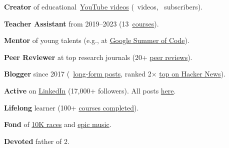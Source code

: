 \documentclass{files/CV/cesar}
\begin{document}
\textbf{Creator} of educational~\href{https://www.youtube.com/@cesarsotovalero}{YouTube videos} (\youtubevideos~videos, \ytSubscribers~subscribers).

\textbf{Teacher Assistant} from 2019--2023 (13~\href{https://www.cesarsotovalero.net/service#teaching}{courses}).

\textbf{Mentor} of young talents (e.g., at \href{https://summerofcode.withgoogle.com/archive/2021/projects/6679675211874304}{Google Summer of Code}).

\textbf{Peer Reviewer} at top research journals (20+ \href{https://www.cesarsotovalero.net/service#academic-reviewer}{peer reviews}).


\textbf{Blogger} since 2017 (\blogposts~\href{https://www.cesarsotovalero.net/blog}{long-form posts}, ranked 2$\times$ \href{https://news.ycombinator.com/favorites?id=cesarsotovalero}{top on Hacker News}).

\textbf{Active} on \href{https://linkedin.com/in/cesarsotovalero}{LinkedIn} (17,000+ followers). All posts \href{https://www.cesarsotovalero.net/linkedin}{here}.

\textbf{Lifelong} learner (100+ \href{https://www.cesarsotovalero.net/courses.html}{courses completed}).

\textbf{Fond} of \href{https://www.cesarsotovalero.net/races.html}{10K races} and \href{https://open.spotify.com/playlist/1E4xBA3IYuTjtTphOV16FM}{epic music}.

\textbf{Devoted} father of 2.
\end{document}
